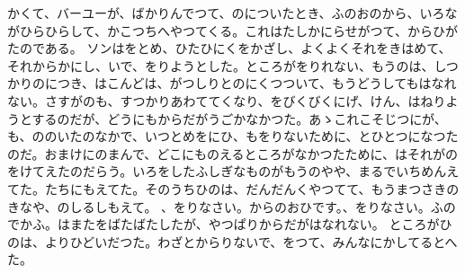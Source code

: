 \documentclass[a4paper,
tate,
book]
{jlreq}
\begin{document}
  かくて、バーユーが、ばかりんでつて、のについたとき、ふのおのから、いろながひらひらして、かこつちへやつてくる。これはたしかにらせがつて、からひがたのである。
  ソンはをとめ、ひたひにくをかざし、よくよくそれをきはめて、それからかにし、いで、をりようとした。ところがをりれない、もうのは、しつかりのにつき、はこんどは、がつしりとのにくつついて、もうどうしてもはなれない。さすがのも、すつかりあわててくなり、をびくびくにげ、けん、はねりようとするのだが、どうにもからだがうごかなかつた。あゝこれこそじつにが、も、ののいたのなかで、いつとめをにひ、もをりないために、とひとつになつたのだ。おまけにのまんで、どこにものえるところがなかつたために、はそれがのをけてえたのだらう。いろをしたふしぎなものがもうのやや、まるでいちめんえてた。たちにもえてた。そのうちひのは、だんだんくやつてて、もうまつさきのきなや、のしるしもえて。
  、をりなさい。からのおひです。、をりなさい。ふのでかふ。はまたをばたばたしたが、やつぱりからだがはなれない。
  ところがひのは、よりひどいだつた。わざとからりないで、をつて、みんなにかしてるとへた。
\end{document}
